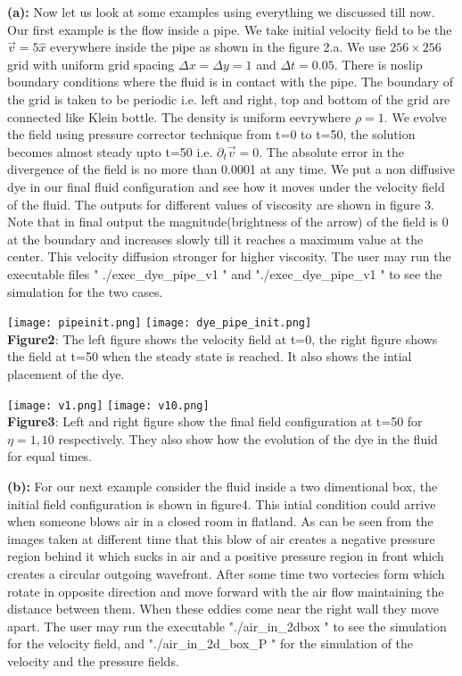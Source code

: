 \documentclass{article}		%
\begin{document}
\textbf{(a):} Now let us look at some examples using everything we discussed till now. Our first example is the flow inside a pipe. We take initial velocity field to be the $\vec{v} = 5 \hat{x}$ everywhere inside the pipe as shown in the figure 2.a. We use $256 \times 256$ grid with uniform grid spacing $\Delta x = \Delta y =1$ and $\Delta t = 0.05$. There is noslip boundary conditions where the fluid is in contact with the pipe. The boundary of the grid is taken to be periodic i.e. left and right, top and bottom of the grid are connected like Klein bottle. The density is uniform eevrywhere $\rho =1 $. We evolve the field using pressure corrector technique from t=0 to t=50, the solution becomes almost steady upto t=50 i.e. $\partial_t \vec{v} =0 $. The absolute error in the divergence of the field is no more than 0.0001 at any time. We put a non diffusive dye in our final fluid configuration and see how it moves under the velocity field of the fluid. The outputs for different values of viscosity are shown in figure 3. Note that in final output the magnitude(brightness of the arrow) of the field is 0 at the boundary and increases slowly till it reaches a maximum value at the center. This velocity diffusion stronger for higher viscosity. The user may run the executable files " ./exec\_dye\_pipe\_v1 " and  "./exec\_dye\_pipe\_v1 " to see the simulation for the two cases.


\begin{center}
\texttt{[image: pipeinit.png]}
\texttt{[image: dye\_pipe\_init.png]}\\		
\textbf{Figure2}: The left figure shows the velocity field at t=0, the right figure shows the field at t=50 when the steady state is reached. It also shows the intial placement of the dye.  
\end{center}

\begin{center}
	\texttt{[image: v1.png]}
	\texttt{[image: v10.png]}\\		
	\textbf{Figure3}:  Left and right figure show the final field configuration at t=50 for $\eta = 1,10$ respectively. They also show how the evolution of the dye in the fluid for equal times.
\end{center}

\textbf{(b):} For our next example consider the fluid inside a two dimentional box, the initial field configuration is shown in figure4. This intial condition could arrive when someone blows air in a closed room in flatland. As can be seen from the images taken at different time that this blow of air creates a negative pressure region behind it which sucks in air and a positive pressure region in front which creates a circular outgoing wavefront. After some time two vortecies form which rotate in opposite direction and move forward with the air flow maintaining the distance between them. When these eddies come near the right wall they move apart. The user may run the executable "./air\_in\_2dbox " to see the simulation for the velocity field, and "./air\_in\_2d\_box\_P " for the simulation of the velocity and the pressure fields.
\end{document}
